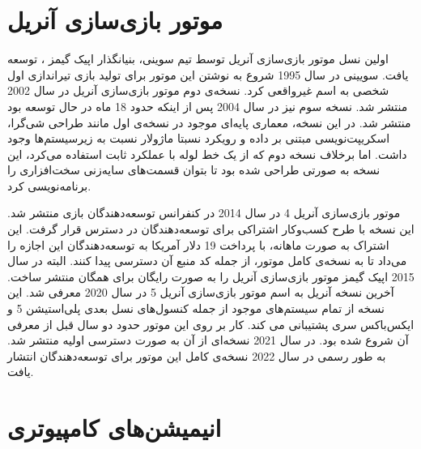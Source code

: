 \section {موتور بازی‌سازی آنریل}

اولین نسل موتور بازی‌سازی آنریل توسط تیم سوینی، بنیانگذار اپیک گیمز
،
توسعه یافت.
سویینی در سال 1995 شروع به نوشتن این موتور برای تولید بازی‌ تیراندازی اول شخصی به اسم غیرواقعی
کرد.
نسخه‌‌ی دوم موتور بازی‌سازی آنریل در سال 2002 منتشر شد. نسخه سوم نیز در سال 2004 پس از اینکه حدود 18 ماه در حال توسعه بود منتشر شد.
در این نسخه، معماری پایه‌ای موجود در نسخه‌ی اول مانند طراحی شی‌گرا، اسکریپت‌نویسی مبتنی بر داده و رویکرد نسبتا ماژولار نسبت به زیرسیستم‌ها وجود داشت.
اما برخلاف نسخه دوم که از یک خط لوله با عملکرد ثابت
استفاده می‌کرد، این نسخه به صورتی طراحی شده بود تا بتوان قسمت‌های سایه‌زنی سخت‌افزاری
را برنامه‌نویسی کرد.

موتور بازی‌سازی آنریل 4 در سال 2014 در کنفرانس توسعه‌دهندگان بازی
منتشر شد.
این نسخه با طرح کسب‌و‌کار اشتراکی برای توسعه‌دهندگان در دسترس قرار گرفت. این اشتراک به صورت ماهانه، با پرداخت 19 دلار آمریکا به توسعه‌دهندگان این اجازه را می‌داد تا به نسخه‌ی کامل موتور، از جمله کد منبع 
آن
دسترسی پیدا‌ کنند.
البته در سال 2015 اپیک گیمز موتور بازی‌سازی آنریل را به صورت رایگان برای همگان منتشر ساخت.
آخرین نسخه آنریل به اسم موتور بازی‌سازی آنریل 5 در سال 2020 معرفی شد. این نسخه از تمام سیستم‌های موجود از جمله کنسول‌های نسل بعدی پلی‌استیشن 5
و ایکس‌باکس سری 
پشتیبانی می کند.
کار بر روی این موتور حدود دو سال قبل از معرفی آن شروع شده بود. در سال 2021 نسخه‌ای از آن به صورت دسترسی اولیه منتشر شد. به طور رسمی در سال 2022 نسخه‌ی کامل این موتور برای توسعه‌دهندگان انتشار یافت.
\cite{UnrealEngineWikiPedia}

\section{انیمیشن‌های کامپیوتری}
